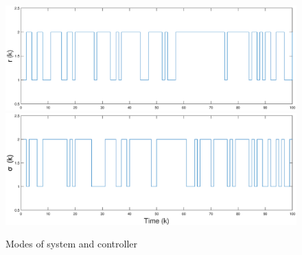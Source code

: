 \documentclass[conference]{IEEEtran}
\begin{document}
\begin{figure}[!htb]
	\centering\includegraphics[scale=0.25]{./simulink/mode_p.eps}\\ 
 	\centering\includegraphics[scale=0.25]{./simulink/mode_k.eps}\\ 
	\caption{Modes of system and controller}
	\label{fig.1}
\end{figure}
\end{document}
